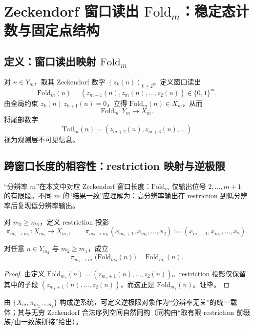 \section{Zeckendorf 窗口读出 \texorpdfstring{$\mathrm{Fold}_m$}{Fold\_m}：稳定态计数与固定点结构}

\subsection{定义：窗口读出映射 \texorpdfstring{$\mathrm{Fold}_m$}{Fold\_m}}

对 $n\in Y_m$，取其 Zeckendorf 数字 $(z_k(n))_{k\ge 2}$。定义窗口读出
\[
\mathrm{Fold}_m(n)=(z_{m+1}(n),z_m(n),\dots,z_2(n))\in\{0,1\}^m.
\]
由全局约束 $z_k(n)\,z_{k+1}(n)=0$，立得 $\mathrm{Fold}_m(n)\in X_m$，从而
\[
\mathrm{Fold}_m:Y_m\to X_m.
\]
将尾部数字
\[
\mathrm{Tail}_m(n)=(z_{m+2}(n),z_{m+3}(n),\dots)
\]
视为观测层不可见信息。

\subsection{跨窗口长度的相容性：restriction 映射与逆极限}\label{subsec:foldm-compat-inverse}

“分辨率 $m$”在本文中对应 Zeckendorf 窗口长度：$\mathrm{Fold}_m$ 仅输出位号 $2,\dots,m+1$ 的有限段。不同 $m$ 的“结果一致”应理解为：高分辨率输出在 restriction 到低分辨率后复现低分辨率输出。

\begin{definition}[restriction 投影]\label{def:foldm-pi}
对 $m_2\ge m_1$，定义 restriction 投影
\[
\pi_{m_2\to m_1}:X_{m_2}\to X_{m_1},\qquad
\pi_{m_2\to m_1}(x_{m_2+1},x_{m_2},\dots,x_2):=(x_{m_1+1},x_{m_1},\dots,x_2).
\]
\end{definition}

\begin{lemma}[逐点相容性]\label{lem:foldm-pointwise-compat}
对任意 $n\in Y_{m_2}$ 与 $m_2\ge m_1$，成立
\[
\pi_{m_2\to m_1}\bigl(\mathrm{Fold}_{m_2}(n)\bigr)=\mathrm{Fold}_{m_1}(n).
\]
\end{lemma}

\begin{proof}
由定义 $\mathrm{Fold}_{m_2}(n)=(z_{m_2+1}(n),\dots,z_2(n))$。restriction 投影仅保留其中的子段 $(z_{m_1+1}(n),\dots,z_2(n))$，而这正是 $\mathrm{Fold}_{m_1}(n)$。证毕。
\end{proof}

由 $\{X_m,\pi_{m_2\to m_1}\}$ 构成逆系统，可定义逆极限对象作为“分辨率无关”的统一载体；其与无穷 Zeckendorf 合法序列空间自然同构（同构由“取有限 restriction 前缀族/由一致族拼接”给出）。

